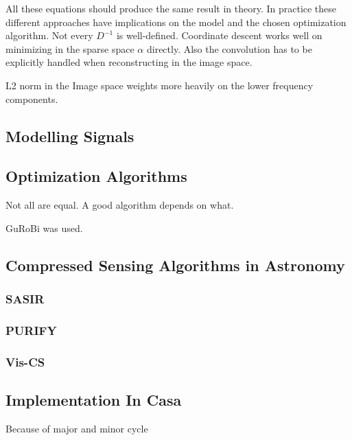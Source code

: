 All these equations should produce the same result in theory. In practice these different approaches have implications on the model and the chosen optimization algorithm. Not every $D^{-1}$ is well-defined. Coordinate descent works well on minimizing in the sparse space $\alpha$ directly. Also the convolution has to be explicitly handled when reconstructing in the image space.

L2 norm in the Image space weights more heavily on the lower frequency components.

\subsection{Modelling Signals}



\subsection{Optimization Algorithms}

Not all are equal. A good algorithm depends on what.

GuRoBi was used.


\subsection{Compressed Sensing Algorithms in Astronomy}

\subsubsection{SASIR}

\subsubsection{PURIFY}

\subsubsection{Vis-CS}



\subsection{Implementation In Casa}

Because of major and minor cycle
